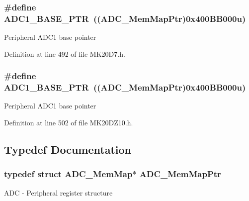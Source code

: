 \subsubsection[{\texorpdfstring{A\+D\+C1\+\_\+\+B\+A\+S\+E\+\_\+\+P\+TR}{ADC1_BASE_PTR}}]{\setlength{\rightskip}{0pt plus 5cm}\#define A\+D\+C1\+\_\+\+B\+A\+S\+E\+\_\+\+P\+TR~(({\bf A\+D\+C\+\_\+\+Mem\+Map\+Ptr})0x400\+B\+B000u)}\hypertarget{group___a_d_c___peripheral_ga7fb56938ede79eea2065c4294db3b2d3}{}\label{group___a_d_c___peripheral_ga7fb56938ede79eea2065c4294db3b2d3}
Peripheral A\+D\+C1 base pointer 

Definition at line 492 of file M\+K20\+D7.\+h.

\subsubsection[{\texorpdfstring{A\+D\+C1\+\_\+\+B\+A\+S\+E\+\_\+\+P\+TR}{ADC1_BASE_PTR}}]{\setlength{\rightskip}{0pt plus 5cm}\#define A\+D\+C1\+\_\+\+B\+A\+S\+E\+\_\+\+P\+TR~(({\bf A\+D\+C\+\_\+\+Mem\+Map\+Ptr})0x400\+B\+B000u)}\hypertarget{group___a_d_c___peripheral_ga7fb56938ede79eea2065c4294db3b2d3}{}\label{group___a_d_c___peripheral_ga7fb56938ede79eea2065c4294db3b2d3}
Peripheral A\+D\+C1 base pointer 

Definition at line 502 of file M\+K20\+D\+Z10.\+h.



\subsection{Typedef Documentation}
\subsubsection[{\texorpdfstring{A\+D\+C\+\_\+\+Mem\+Map\+Ptr}{ADC_MemMapPtr}}]{\setlength{\rightskip}{0pt plus 5cm}typedef struct {\bf A\+D\+C\+\_\+\+Mem\+Map}$\ast$ {\bf A\+D\+C\+\_\+\+Mem\+Map\+Ptr}}\hypertarget{group___a_d_c___peripheral_ga1673c677bf7c0ca339c8563e06de75fa}{}\label{group___a_d_c___peripheral_ga1673c677bf7c0ca339c8563e06de75fa}
A\+DC -\/ Peripheral register structure 
